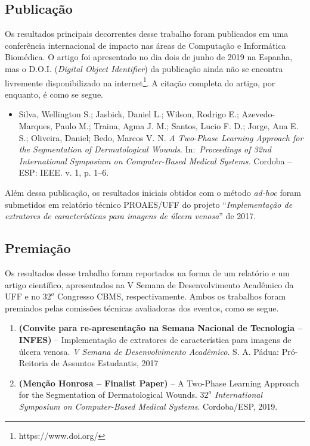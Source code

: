 \subsection{Publicação}

Os resultados principais decorrentes desse trabalho foram publicados em uma conferência internacional de impacto nas áreas de Computação e Informática Biomédica.
O artigo foi apresentado no dia dois de junho de 2019 na Espanha, mas o D.O.I. (\textit{Digital Object Identifier}) da publicação ainda não se encontra livremente disponibilizado na internet\footnote{https://www.doi.org/}. 
A citação completa do artigo, por enquanto, é como se segue.

\begin{itemize}
    \item Silva, Wellington S.; Jasbick, Daniel L.; Wilson, Rodrigo E.; Azevedo-Marques, Paulo M.; Traina, Agma J. M.; Santos, Lucio F. D.; Jorge, Ana E. S.; Oliveira, Daniel; Bedo, Marcos V. N. \textit{A Two-Phase Learning Approach for the Segmentation of Dermatological Wounds}. In:~\textit{Proceedings of 32nd International Symposium on Computer-Based Medical Systems.} Cordoba – ESP: IEEE. v. 1, p. 1–6. 
\end{itemize}

Além dessa publicação, os resultados iniciais obtidos com o método \textit{ad-hoc} foram submetidos em relatório técnico PROAES/UFF do projeto ``\textit{Implementação de extratores de características para imagens de úlcera venosa}'' de 2017. 

\subsection{Premiação}

Os resultados desse trabalho foram reportados na forma de um relatório e um artigo científico, apresentados na V Semana de Desenvolvimento Acadêmico da UFF e no $32^o$ Congresso CBMS, respectivamente.
Ambos os trabalhos foram premiados pelas comissões técnicas avaliadoras dos eventos, como se segue.

\begin{enumerate}
    \item \textbf{(Convite para re-apresentação na Semana Nacional de Tecnologia -- INFES)} -- Implementação de extratores de característica para imagens de úlcera venosa.  \textit{V Semana de Desenvolvimento Acadêmico}.
    S. A. Pádua: Pró-Reitoria de Assuntos Estudantis, 2017

    \item \textbf{(Menção Honrosa -- Finalist Paper)} -- A Two-Phase Learning Approach for the Segmentation of Dermatological Wounds. 
    \textit{$32^o$ International Symposium on Computer-Based Medical Systems}. Cordoba/ESP, 2019.
\end{enumerate}


